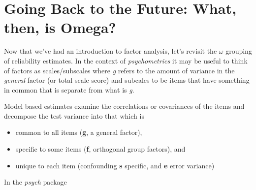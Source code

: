 \documentclass[
  english,
]{book}
\providecommand{\tightlist}{%
  \setlength{\itemsep}{0pt}\setlength{\parskip}{0pt}}
\begin{document}
\hypertarget{going-back-to-the-future-what-then-is-omega}{%
\section{Going Back to the Future: What, then, is Omega?}\label{going-back-to-the-future-what-then-is-omega}}

Now that we've had an introduction to factor analysis, let's revisit the \(\omega\) grouping of reliability estimates. In the context of \emph{psychometrics} it may be useful to think of factors as scales/subscales where \emph{g} refers to the amount of variance in the \emph{general} factor (or total scale score) and subcales to be items that have something in common that is separate from what is \emph{g}.

Model based estimates examine the correlations or covariances of the items and decompose the test variance into that which is

\begin{itemize}
\tightlist
\item
  common to all items (\textbf{g}, a general factor),
\item
  specific to some items (\textbf{f}, orthogonal group factors), and
\item
  unique to each item (confounding \textbf{s} specific, and \textbf{e} error variance)
\end{itemize}

In the \emph{psych} package
\end{document}

